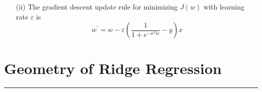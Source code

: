\documentclass{article}
\begin{document}
\begin{itemize}
\begin{itemize}
\begin{itemize}
                        \item [(ii)] The gradient descent update rule for minimizing $J(w)$ with learning rate $\varepsilon$ is
                            \begin{equation*}
                                w^{\prime} = w - \varepsilon\left(\dfrac{1}{1 + e^{-x^{T}w}} - y\right)x
                            \end{equation*}
                    \end{itemize}
            \end{itemize}
    \end{itemize}

\newpage
\section*{Geometry of Ridge Regression}
\hrule
\end{document}
